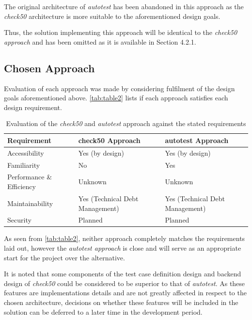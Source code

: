 \documentclass[hidelinks, 12pt]{extreport}
\begin{document}
The original architecture of \textit{autotest} has been abandoned in this approach as the \textit{check50} architecture is more suitable to the aforementioned design goals.

Thus, the solution implementing this approach will be identical to the \textit{check50 approach} and has been omitted as it is available in Section 4.2.1.

\subsection{Chosen Approach}

Evaluation of each approach was made by considering fulfilment of the design goals aforementioned above. \autoref{tab:table2} lists if each approach satisfies each design requirement.

\begin{table}[h]
	\centering
	\begin{tabular}{lll}
		\toprule
		\textbf{Requirement} & \textbf{check50 Approach} & \textbf{autotest Approach} \\
		\midrule
		Accessibility    & Yes (by design) & Yes (by design) \\
		Familiarity      & No  & Yes \\
		Performance \& Efficiency & Unknown & Unknown \\
		Maintainability  & Yes (Technical Debt Management) & Yes (Technical Debt Management) \\
		Security 		 & Planned & Planned \\
		\bottomrule
	\end{tabular}
	\caption{Evaluation of the \textit{check50} and \textit{autotest} approach against the stated requirements}
	\label{tab:table2}
\end{table}

As seen from \autoref{tab:table2}, neither approach completely matches the requirements laid out, however the \textit{autotest approach} is close and will serve as an appropriate start for the project over the alternative.

It is noted that some components of the test case definition design and backend design of \textit{check50} could be considered to be superior to that of \textit{autotest}. As these features are implementations details and are not greatly affected in respect to the chosen architecture, decisions on whether these features will be included in the solution can be deferred to a later time in the development period.
\end{document}
